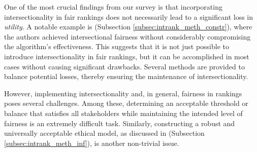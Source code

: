 One of the most crucial findings from our survey is that incorporating intersectionality in fair rankings does not necessarily lead to a significant loss in \emph{utility}. A notable example is \cite{mehrotra2021mitigating} (Subsection \ref{subsec:intrank_meth_constr}), where the authors achieved intersectional fairness without considerably compromising the algorithm's effectiveness.
This suggests that it is not just possible to introduce intersectionality in fair rankings, but it can be accomplished in most cases without causing significant drawbacks. Several methods are provided to balance potential losses, thereby ensuring the maintenance of intersectionality.

However, implementing intersectionality and, in general, fairness in rankings poses several challenges.
Among these, determining an acceptable threshold or balance that satisfies all stakeholders while maintaining the intended level of fairness is an extremely difficult task. Similarly, constructing a robust and universally acceptable ethical model, as discussed in \cite{yang2020causal} (Subsection \ref{subsec:intrank_meth_inf}), is another non-trivial issue.
